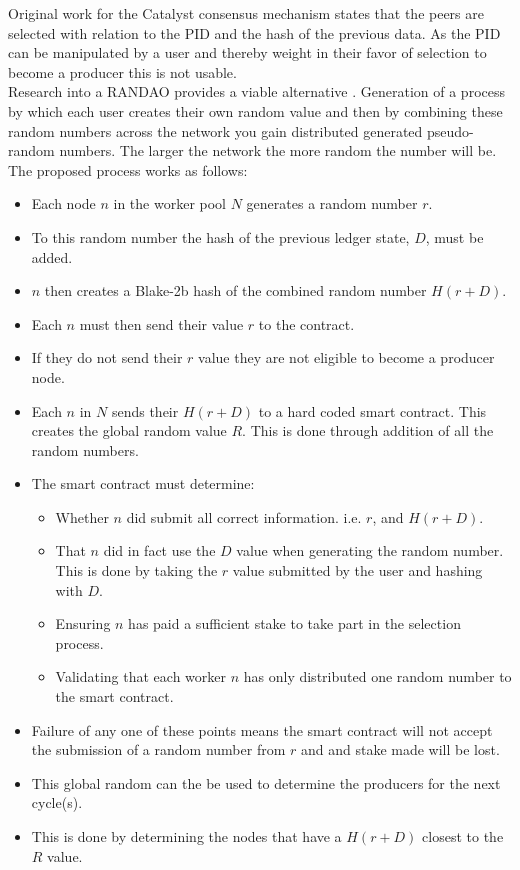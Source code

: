 Original work for the Catalyst consensus mechanism states that the peers are selected with relation to the PID and the hash of the previous data. As the PID can be manipulated by a user and thereby weight in their favor of selection to become a producer this is not usable. \\

Research into a RANDAO provides a viable alternative \cite{skvorc}\cite{randao}. Generation of a process by which each user creates their own random value and then by combining these random numbers across the network you gain distributed generated pseudo-random numbers. The larger the network the more random the number will be. The proposed process works as follows: \\

\begin{itemize}

\item Each node $n$ in the worker pool $N$ generates a random number $r$.
\item To this random number the hash of the previous ledger state, $D$, must be added.
\item $n$ then creates a Blake-2b hash of the combined random number $H(r + D)$.
\item Each $n$ must then send their value $r$ to the contract.
\item If they do not send their $r$ value they are not eligible to become a producer node.
\item Each $n$ in $N$ sends their $H(r + D)$ to a hard coded smart contract. This creates the global random value $R$. This is done through addition of all the random numbers.
\item The smart contract must determine:
\begin{itemize}
\item Whether $n$ did submit all correct information. i.e. $r$, and $H(r+D)$.
\item That $n$ did in fact use the $D$ value when generating the random number. This is done by taking the $r$ value submitted by the user and hashing with $D$.
\item Ensuring $n$ has paid a sufficient stake to take part in the selection process.
\item Validating that each worker $n$ has only distributed one random number to the smart contract.
\end{itemize}
\item Failure of any one of these points means the smart contract will not accept the submission of a random number from $r$ and and stake made will be lost.
\item This global random can the be used to determine the producers for the next cycle(s).
\item This is done by determining the nodes that have a $H(r + D)$ closest to the $R$ value. \\

\end{itemize}

